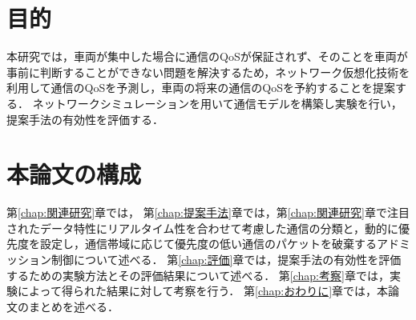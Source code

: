 \documentclass[a4paper,11pt,uplatex]{ujreport}
\begin{document}

\section{目的}
\label{sec:目的}

    本研究では，車両が集中した場合に通信のQoSが保証されず、そのことを車両が事前に判断することができない問題を解決するため，ネットワーク仮想化技術を利用して通信のQoSを予測し，車両の将来の通信のQoSを予約することを提案する．
    ネットワークシミュレーションを用いて通信モデルを構築し実験を行い，提案手法の有効性を評価する．





\section{本論文の構成}
\label{sec:本論文の構成}

  第\ref{chap:関連研究}章では，
  第\ref{chap:提案手法}章では，第\ref{chap:関連研究}章で注目されたデータ特性にリアルタイム性を合わせて考慮した通信の分類と，動的に優先度を設定し，通信帯域に応じて優先度の低い通信のパケットを破棄するアドミッション制御について述べる．
  第\ref{chap:評価}章では，提案手法の有効性を評価するための実験方法とその評価結果について述べる．
  第\ref{chap:考察}章では，実験によって得られた結果に対して考察を行う．
  第\ref{chap:おわりに}章では，本論文のまとめを述べる．
\end{document}
